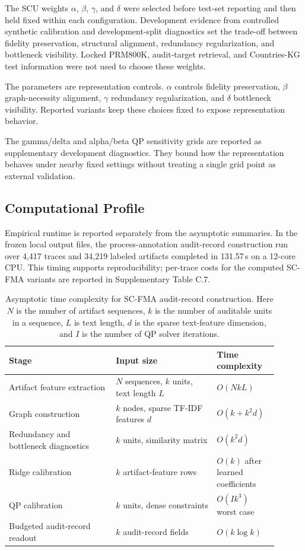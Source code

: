 \documentclass[a4paper,fleqn]{cas-sc}
\begin{document}
The SCU weights $\alpha$, $\beta$, $\gamma$, and $\delta$ were selected before test-set reporting and then held fixed within each configuration. Development evidence from controlled synthetic calibration and development-split diagnostics set the trade-off between fidelity preservation, structural alignment, redundancy regularization, and bottleneck visibility. Locked PRM800K, audit-target retrieval, and Countries-KG test information were not used to choose these weights.

The parameters are representation controls. $\alpha$ controls fidelity preservation, $\beta$ graph-necessity alignment, $\gamma$ redundancy regularization, and $\delta$ bottleneck visibility. Reported variants keep these choices fixed to expose representation behavior.

The gamma/delta and alpha/beta QP sensitivity grids are reported as supplementary development diagnostics. They bound how the representation behaves under nearby fixed settings without treating a single grid point as external validation.

\subsection{Computational Profile}

Empirical runtime is reported separately from the asymptotic summaries. In the frozen local output files, the process-annotation audit-record construction run over 4,417 traces and 34,219 labeled artifacts completed in 131.57\,s on a 12-core CPU. This timing supports reproducibility; per-trace costs for the computed SC-FMA variants are reported in Supplementary Table C.7.

\begin{table}[ht]
\caption{Asymptotic time complexity for SC-FMA audit-record construction. Here $N$ is the number of artifact sequences, $k$ is the number of auditable units in a sequence, $L$ is text length, $d$ is the sparse text-feature dimension, and $I$ is the number of QP solver iterations.}
\label{tab:complexity-summary}
\centering
\small
\renewcommand{\arraystretch}{1.08}
\begin{tabular}{p{0.36\linewidth}p{0.34\linewidth}p{0.20\linewidth}}
\toprule
\textbf{Stage} & \textbf{Input size} & \textbf{Time complexity} \\
\midrule
Artifact feature extraction & $N$ sequences, $k$ units, text length $L$ & $O(NkL)$ \\
Graph construction & $k$ nodes, sparse TF-IDF features $d$ & $O(k+k^2d)$ \\
Redundancy and bottleneck diagnostics & $k$ units, similarity matrix & $O(k^2d)$ \\
Ridge calibration & $k$ artifact-feature rows & $O(k)$ after learned coefficients \\
QP calibration & $k$ units, dense constraints & $O(Ik^3)$ worst case \\
Budgeted audit-record readout & $k$ audit-record fields & $O(k\log k)$ \\
\bottomrule
\end{tabular}
\end{table}
\end{document}
